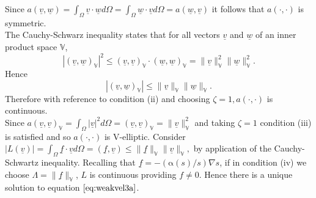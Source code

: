\documentclass[11pt]{article}
\newcommand{\ul}{\underline}
\newcommand{\bigv}{\mathbb{V}}
\newcommand{\Om}{\Omega}
\newcommand{\al}{\mathrm{\alpha}}
\begin{document}
Since $a(\ul{v},\ul{w}) = \int_{\Om}\ul{v}\cdot\ul{w}d{\Om}= \int_{\Om}\ul{w}\cdot\ul{v}d{\Om}= a(\ul{w},\ul{v})$ it follows that $a(\cdot,\cdot)$ is symmetric.\\
The Cauchy-Schwarz inequality states that for all vectors $\ul{v}$ and $\ul{w}$ of an inner product space $\bigv$, 
$$|(\ul{v},\ul{w})_{\bigv}|^2 \leq (\ul{v},\ul{v})_{\bigv}\cdot(\ul{w},\ul{w})_{\bigv}= \|  \ul{v}   \|_{\bigv}^2\|  \ul{w}   \|_{\bigv}^2    .$$
Hence $$|(\ul{v},\ul{w})_{\bigv}| \leq \|  \ul{v}   \|_{\bigv}\|  \ul{w}   \|_{\bigv}    .$$
Therefore with reference to condition (ii) and choosing $\zeta = 1, a(\cdot,\cdot)$ is continuous.\\   
Since $a(\ul{v},\ul{v})_{\bigv}= \int_{\Om}|\ul{v}|^2d\Om = (\ul{v},\ul{v})_{\bigv} =     \|  \ul{v}   \|_{\bigv}^2      $ and taking $\zeta = 1$ condition (iii) is satisfied and so $a(\cdot,\cdot)$ is V-elliptic.
Consider $|L(\ul{v})| =   \int_{\Om}\ul{f}\cdot\ul{v}d\Om = (\ul{f},\ul{v}) \leq \|\ul{f}\|_{\bigv}\|\ul{v}\|_{\bigv},$ by application of the Cauchy-Schwartz inequality. Recalling that $\ul{f} = -(\al(s)/s)\nabla{s}$, if in condition (iv) we choose $\Lambda = \|\ul{f}\|_{\bigv}$, $L$ is continuous providing $f\ne0$.
Hence there is a unique solution to equation $\ref{eq:weakvel3a}$.
\end{document}
